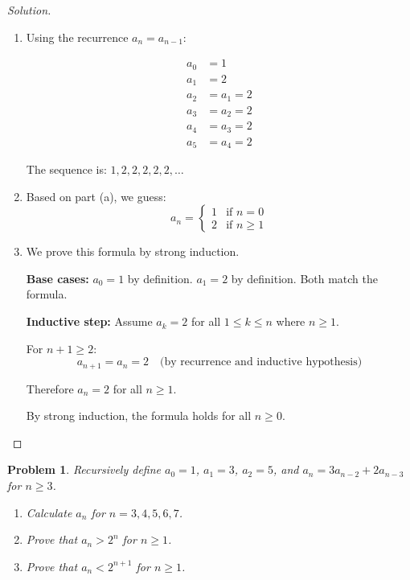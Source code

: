 \documentclass[12pt]{article}
\newtheorem{problem}{Problem}
\begin{document}
\begin{proof}[Solution]
~
\begin{enumerate}[label=(\alph*)]
    \item Using the recurrence $a_n = a_{n-1}$:
    
    \begin{align*}
    a_0 &= 1 \\
    a_1 &= 2 \\
    a_2 &= a_1 = 2 \\
    a_3 &= a_2 = 2 \\
    a_4 &= a_3 = 2 \\
    a_5 &= a_4 = 2
    \end{align*}
    
    The sequence is: $1, 2, 2, 2, 2, 2, \ldots$
    
    \item Based on part (a), we guess:
    $$a_n = \begin{cases} 1 & \text{if } n = 0 \\ 2 & \text{if } n \geq 1 \end{cases}$$
    
    \item We prove this formula by strong induction.
    
    \textbf{Base cases:} $a_0 = 1$ by definition. $a_1 = 2$ by definition. Both match the formula.
    
    \textbf{Inductive step:} Assume $a_k = 2$ for all $1 \leq k \leq n$ where $n \geq 1$.
    
    For $n + 1 \geq 2$:
    $$a_{n+1} = a_n = 2 \quad \text{(by recurrence and inductive hypothesis)}$$
    
    Therefore $a_n = 2$ for all $n \geq 1$.
    
    By strong induction, the formula holds for all $n \geq 0$.
\end{enumerate}
\end{proof}

\newpage

\setcounter{problem}{11}
\begin{problem}
Recursively define $a_0 = 1$, $a_1 = 3$, $a_2 = 5$, and $a_n = 3a_{n-2} + 2a_{n-3}$ for $n \geq 3$.

\begin{enumerate}[label=(\alph*)]
    \item Calculate $a_n$ for $n = 3, 4, 5, 6, 7$.
    
    \item Prove that $a_n > 2^n$ for $n \geq 1$.
    
    \item Prove that $a_n < 2^{n+1}$ for $n \geq 1$.
\end{enumerate}
\end{problem}
\end{document}
